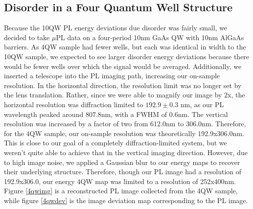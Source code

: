 \subsection{Disorder in a Four Quantum Well Structure}
Because the 10QW PL energy deviations due disorder was fairly small, we decided to take $\mu$PL data on a four-period 10nm GaAs QW with 10nm AlGaAs barriers. As 4QW sample had fewer wells, but each was identical in width to the 10QW sample, we expected to see larger disorder energy deviations because there would be fewer wells over which the signal would be averaged. Additionally, we inserted a telescope into the PL imaging path, increasing our on-sample resolution. In the horizontal direction, the resolution limit was no longer set by the lens translation. Rather, since we were able to magnify our image by 2x, the horizontal resolution was diffraction limited to $192.9\pm0.3$ nm, as our PL wavelength peaked around 807.8nm, with a FWHM of 0.6nm. The vertical resolution was increased by a factor of two from 612.0nm to 306.0nm. Therefore, for the 4QW sample, our on-sample resolution was theoretically 192.9x306.0nm. This is close to our goal of a completely diffraction-limited system, but we weren't quite able to achieve that in the vertical imaging direction. However, due to high image noise, we applied a Gaussian blur to our energy maps to recover their underlying structure. Therefore, though our PL image had a resolution of 192.9x306.0, our energy 4QW map was limited to a resolution of 252x400nm. Figure \ref{4qwimg} is a reconstructed PL image collected from the 4QW sample, while figure \ref{4qwdev} is the image deviation map corresponding to the PL image. 

